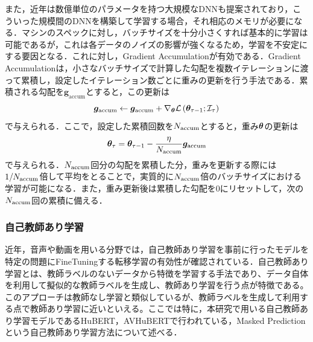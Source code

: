 また，近年は数億単位のパラメータを持つ大規模なDNNも提案されており，こういった規模間のDNNを構築して学習する場合，それ相応のメモリが必要になる．マシンのスペックに対し，バッチサイズを十分小さくすれば基本的に学習は可能であるが，これは各データのノイズの影響が強くなるため，学習を不安定にする要因となる．これに対し，Gradient Accumulationが有効である．Gradient Accumulationは，小さなバッチサイズで計算した勾配を複数イテレーションに渡って累積し，設定したイテレーション数ごとに重みの更新を行う手法である．累積される勾配を$\bm{g}_{\text{accum}}$とすると，この更新は
\begin{equation}
    \bm{g}_{\text{accum}} \gets \bm{g}_{\text{accum}} + \nabla_{\bm{\theta}} \mathcal{L}\left(\bm{\theta}_{\tau - 1}; \mathcal{I}_{\tau}\right)
\end{equation}
で与えられる．ここで，設定した累積回数を$N_{\text{accum}}$とすると，重み$\bm{\theta}$の更新は
\begin{equation}
    \bm{\theta}_{\tau} = \bm{\theta}_{\tau - 1} - \frac{\eta}{N_{\text{accum}}} \bm{g}_{\text{accum}}
\end{equation}
で与えられる．$N_{\text{accum}}$回分の勾配を累積した分，重みを更新する際には$1 / N_{\text{accum}}$倍して平均をとることで，実質的に$N_{\text{accum}}$倍のバッチサイズにおける学習が可能になる．また，重み更新後は累積した勾配を0にリセットして，次の$N_{\text{accum}}$回の累積に備える．

\subsubsection{自己教師あり学習}
\label{sec3:sec:ssl}
近年，音声や動画を用いる分野では，自己教師あり学習を事前に行ったモデルを特定の問題にFineTuningする転移学習の有効性が確認されている．自己教師あり学習とは、教師ラベルのないデータから特徴を学習する手法であり、データ自体を利用して擬似的な教師ラベルを生成し、教師あり学習を行う点が特徴である。このアプローチは教師なし学習と類似しているが、教師ラベルを生成して利用する点で教師あり学習に近いといえる。ここでは特に，本研究で用いる自己教師あり学習モデルであるHuBERT\cite{hsu2021hubert}，AVHuBERT\cite{shi2022learning}で行われている，Masked Predictionという自己教師あり学習方法について述べる．

